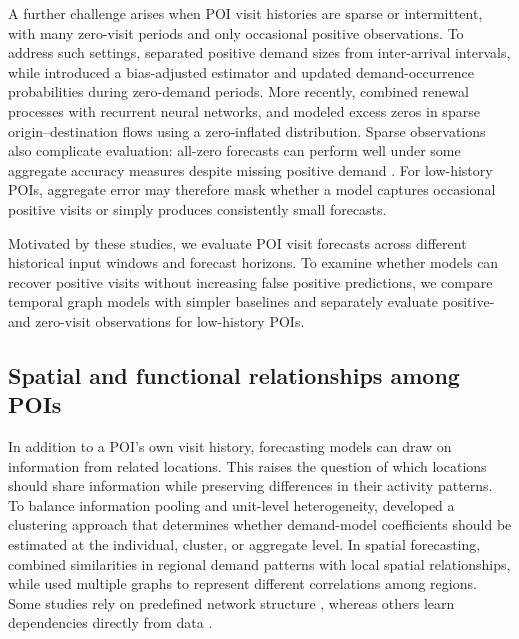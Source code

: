\documentclass[preprint,authoryear,11pt]{elsarticle}
\def\citep#1{}%
\theoremstyle{definition}
\begin{document}
A further challenge arises when POI visit histories are sparse or intermittent, with many zero-visit periods and only occasional positive observations.
To address such settings, \citet{croston1972forecasting} separated positive demand sizes from inter-arrival intervals, while \citet{syntetos2005accuracy} introduced a bias-adjusted estimator and \citet{teunter2011intermittent} updated demand-occurrence probabilities during zero-demand periods.
More recently, \citet{turkmen2021forecasting} combined renewal processes with recurrent neural networks, and \citet{zhuang2022uncertainty} modeled excess zeros in sparse origin--destination flows using a zero-inflated distribution.
Sparse observations also complicate evaluation: all-zero forecasts can perform well under some aggregate accuracy measures despite missing positive demand \citep{turkmen2021forecasting}.
For low-history POIs, aggregate error may therefore mask whether a model captures occasional positive visits or simply produces consistently small forecasts.

Motivated by these studies, we evaluate POI visit forecasts across different historical input windows and forecast horizons.
To examine whether models can recover positive visits without increasing false positive predictions, we compare temporal graph models with simpler baselines and separately evaluate positive- and zero-visit observations for low-history POIs.


\subsection{Spatial and functional relationships among POIs}
\label{lit_sfr}

In addition to a POI's own visit history, forecasting models can draw on information from related locations.
This raises the question of which locations should share information while preserving differences in their activity patterns.
To balance information pooling and unit-level heterogeneity, \citet{cohen2022data} developed a clustering approach that determines whether demand-model coefficients should be estimated at the individual, cluster, or aggregate level.
In spatial forecasting, \citet{yao2018deep} combined similarities in regional demand patterns with local spatial relationships, while \citet{geng2019spatiotemporal} used multiple graphs to represent different correlations among regions.
Some studies rely on predefined network structure \citep{li2018diffusion}, whereas others learn dependencies directly from data \citep{wu2019graph,bai2020adaptive}.
\end{document}
